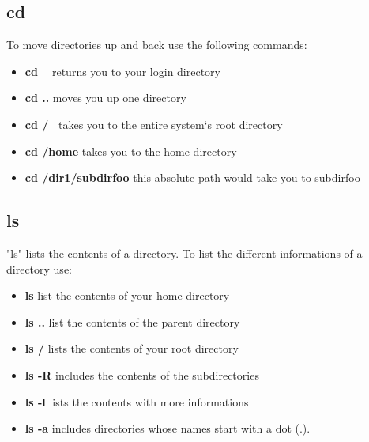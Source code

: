 \documentclass[10pt,a4paper]{scrartcl}
\begin{document}
\subsection{cd}
To move directories up and back use the following commands:
\begin{doublespacing}
\begin{itemize}
\item{\bf{cd \ }} \qquad  \qquad \qquad returns you to your login directory
\item{\bf{cd ..}} \qquad  \qquad \qquad moves you up one directory
\item{\bf{cd /\ }} \qquad \qquad \qquad takes you to the entire system`s root directory
\item{\bf{cd /home}} \qquad \qquad takes you to the home directory
\item{\bf{cd /dir1/subdirfoo}} \qquad this absolute path would take you to subdirfoo
\end{itemize}
\end{doublespacing}

\subsection{ls}
\begin{singlespacing}
"ls" lists the contents of a directory. To list the different informations of a directory use:
\end{singlespacing}
\begin{doublespacing}
\begin{itemize}
\item{\bf{ls}} \qquad \qquad \qquad list the contents of your home directory
\item{\bf{ls ..}} \qquad \qquad \qquad list the contents of the parent directory
\item{\bf{ls /}} \qquad \qquad \qquad lists the contents of your root directory
\item{\bf{ls -R}} \qquad \qquad \qquad includes the contents of the subdirectories
\item{\bf{ls -l}} \qquad \qquad\qquad lists the contents with more informations
\item{\bf{ls -a}} \qquad \qquad \qquad includes directories whose names start with a dot (.).
\end{itemize}
\end{doublespacing}
\end{document}
